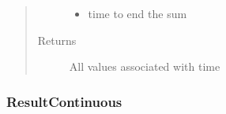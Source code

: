 \documentclass[letterpaper,10pt,english]{sphinxmanual}
\begin{document}
\begin{fulllineitems}
\begin{fulllineitems}
\begin{quote}
\begin{description}
\begin{itemize}
\item {} 
 \textendash{} time to end the sum

\end{itemize}

\item[{Returns}] \leavevmode
All values associated with time

\end{description}\end{quote}

\end{fulllineitems}


\end{fulllineitems}



\subsubsection{ResultContinuous}
\label{\detokenize{index:resultcontinuous}}
\end{document}
